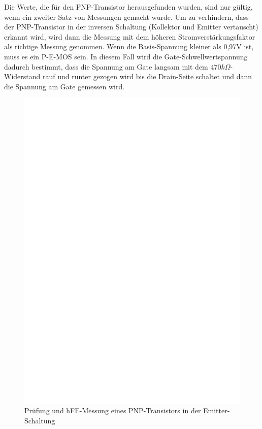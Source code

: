 Die Werte, die f\"ur den PNP-Transistor herausgefunden wurden, sind nur g\"ultig, wenn ein zweiter Satz
von Messungen gemacht wurde.
Um zu verhindern, dass der PNP-Transistor in der inversen Schaltung (Kollektor und Emitter vertauscht) erkannt
wird, wird dann die Messung mit dem h\"oheren Stromverst\"arkungsfaktor als richtige Messung genommen.
Wenn die Basis-Spannung kleiner als 0,97V ist, muss es ein P-E-MOS sein.
In diesem Fall wird die Gate-Schwellwertspannung dadurch bestimmt, dass die Spannung am Gate langsam mit dem
 \(470k\Omega\)-Widerstand rauf und runter gezogen wird bis die Drain-Seite schaltet und dann
die Spannung am Gate gemessen wird.

\begin{figure}[H]
\centering
\includegraphics[]{../FIG/PNPce.eps}
\caption{Pr\"ufung und hFE-Messung eines PNP-Transistors in der Emitter-Schaltung}
\label{fig:pnpce}
\end{figure}

